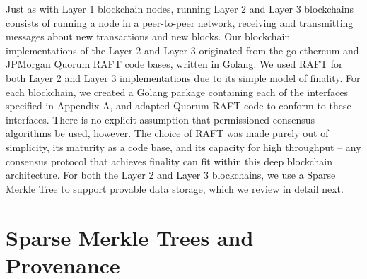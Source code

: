 \documentclass{article}
\begin{document}
\noindent Just as with Layer 1 blockchain nodes, running Layer 2 and Layer 3 blockchains consists of running a node in a peer-to-peer network, receiving and transmitting messages about new transactions and new blocks.   Our blockchain implementations of the Layer 2 and Layer 3 originated from the go-ethereum and JPMorgan Quorum RAFT code bases, written in Golang.  We used RAFT for both Layer 2 and Layer 3 implementations due to its simple model of finality.  For each blockchain, we created a Golang package containing each of the interfaces specified in Appendix A, and adapted Quorum RAFT code to conform to these interfaces.  There is no explicit assumption that  permissioned consensus algorithms be used, however.   The choice of RAFT was made purely out of simplicity, its maturity as a code base, and its capacity for high throughput -- any consensus protocol that achieves finality can fit within this deep blockchain architecture.  For both the Layer 2 and Layer 3 blockchains, we use a Sparse Merkle Tree to support provable data storage, which we review in detail next.

\section{Sparse Merkle Trees and Provenance}
\end{document}
